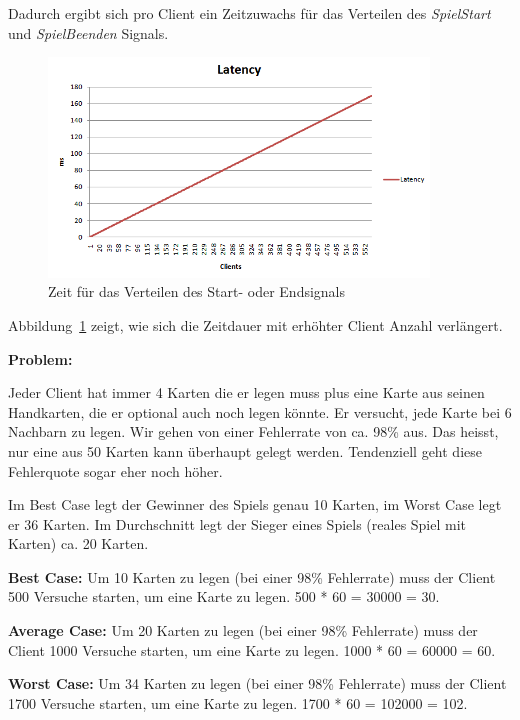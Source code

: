 Dadurch ergibt sich pro Client ein Zeitzuwachs für das Verteilen des \textit{SpielStart} und \textit{SpielBeenden} Signals.

\begin{figure}[hbt]
  \centering
  \includegraphics[width=0.9\textwidth,angle=0]{graphics/latency.png}
  \caption{Zeit für das Verteilen des Start- oder Endsignals \hfill{} }
  \label{ergebnislatency}
 \end{figure}
 
Abbildung~\ref{ergebnislatency} zeigt, wie sich die Zeitdauer mit erhöhter Client Anzahl verlängert.
 
\textbf{Problem:}

Jeder Client hat immer 4 Karten die er legen muss plus eine Karte aus seinen Handkarten, die er optional auch noch legen könnte. Er versucht, jede Karte bei 6 Nachbarn zu legen. Wir gehen von einer Fehlerrate von ca. 98\% aus. Das heisst, nur eine aus 50 Karten kann überhaupt gelegt werden. Tendenziell geht diese Fehlerquote sogar eher noch höher.

Im Best Case legt der Gewinner des Spiels genau 10 Karten, im Worst Case legt er 36 Karten. Im Durchschnitt legt der Sieger eines Spiels (reales Spiel mit Karten) ca. 20 Karten. 

\textbf{Best Case:} Um 10 Karten zu legen (bei einer 98\% Fehlerrate) muss der Client 500 Versuche starten, um eine Karte zu legen. \unit{500} * \unit{60}{\micro\second} = \unit{30000}{\micro\second} = \unit{30}{\milli\second}.

\textbf{Average Case:} Um 20 Karten zu legen (bei einer 98\% Fehlerrate) muss der Client 1000 Versuche starten, um eine Karte zu legen. \unit{1000} * \unit{60}{\micro\second} = \unit{60000}{\micro\second} = \unit{60}{\milli\second}.

\textbf{Worst Case:} Um 34 Karten zu legen (bei einer 98\% Fehlerrate) muss der Client 1700 Versuche starten, um eine Karte zu legen. \unit{1700} * \unit{60}{\micro\second} = \unit{102000}{\micro\second} = \unit{102}{\milli\second}.

